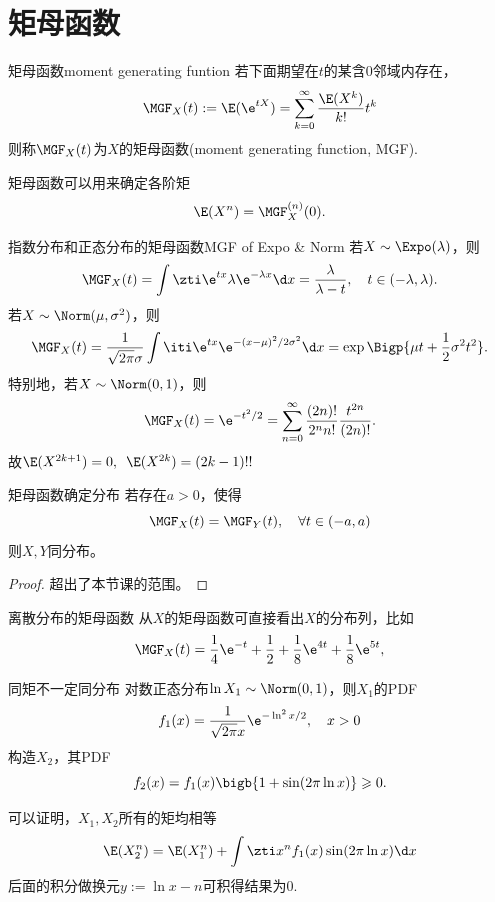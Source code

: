\section{矩母函数}
\begin{definition}{矩母函数}{moment generating funtion}
	若下面期望在$t$的某含0邻域内存在，
	\begin{equation}\label{MGF def}
		\MGF_X(t):=\E(\e^{tX})=\sum_{k=0}^\infty\frac{\E(X^k)}{k!}t^k
	\end{equation}
	则称$\MGF_X(t)$为$X$的矩母函数(moment generating function, MGF).
\end{definition}
矩母函数可以用来确定各阶矩
\begin{equation}
	\E(X^n)=\MGF_X^{(n)}(0).
\end{equation}
\begin{example}{指数分布和正态分布的矩母函数}{MGF of Expo & Norm}
	若$X\sim\Expo(\lambda)$，则 
	\[
		\MGF_X(t)=\int\zti\e^{tx}\lambda\e^{-\lambda x}\d x=\frac\lambda{\lambda-t},\quad t\in(-\lambda,\lambda).
	\]
	\tcblower
	若$X\sim\Norm(\mu,\sigma^2)$，则
	\[
		\MGF_X(t)=\frac1{\sqrt{2\pi}\sigma}\int\iti\e^{tx}\e^{-(x-\mu)^2/2\sigma^2}\d x=\exp\Bigp{\mu t+\frac12\sigma^2t^2}.
	\]
	特别地，若$X\sim\Norm(0,1)$，则 
	\[
		\MGF_X(t)=\e^{-t^2/2}=\sum_{n=0}^\infty\frac{(2n)!}{2^nn!}\frac{t^{2n}}{(2n)!}.
	\]
	故$\E(X^{2k+1})=0,\enspace\E(X^{2k})=(2k-1)!!$
\end{example}
\begin{theorem}{矩母函数确定分布}{}
	若存在$a>0$，使得
	\[
		\MGF_X(t)=\MGF_Y(t),\quad\forall t\in(-a,a)
	\]
	则$X,Y$同分布。
\end{theorem}
\begin{proof}
	超出了本节课的范围。
\end{proof}
\begin{example}{离散分布的矩母函数}{}
	从$X$的矩母函数可直接看出$X$的分布列，比如
	\[
		\MGF_X(t)=\frac14\e^{-t}+\frac12+\frac18\e^{4t}+\frac18\e^{5t},
	\]

\end{example}
\begin{example}{同矩不一定同分布}{}
	对数正态分布$\ln X_1\sim\Norm(0,1)$，则$X_1$的PDF
	\[
		f_1(x)=\frac1{\sqrt{2\pi}x}\e^{-\ln^2x/2},\quad x>0
	\]
	构造$X_2$，其PDF
	\[
		f_2(x)=f_1(x)\bigb{1+\sin(2\pi\ln x)}\geqslant 0.
	\]

	可以证明，$X_1,X_2$所有的矩均相等
	\[
		\E(X_2^n)=\E(X_1^n)+\int\zti x^nf_1(x)\sin(2\pi\ln x)\d x
	\]
	后面的积分做换元$y:=\ln x-n$可积得结果为0.
\end{example}
